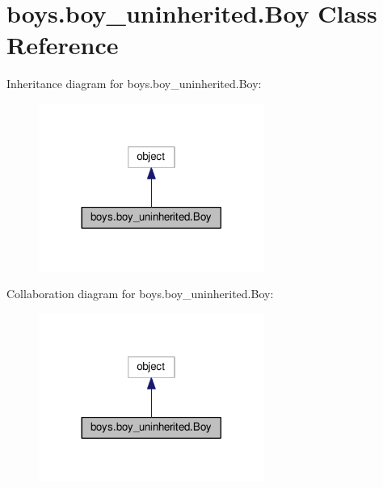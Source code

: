 \hypertarget{classboys_1_1boy__uninherited_1_1_boy}{}\section{boys.\+boy\+\_\+uninherited.\+Boy Class Reference}
\label{classboys_1_1boy__uninherited_1_1_boy}


Inheritance diagram for boys.\+boy\+\_\+uninherited.\+Boy\+:
\nopagebreak
\begin{figure}[H]
\begin{center}
\leavevmode
\includegraphics[width=209pt]{classboys_1_1boy__uninherited_1_1_boy__inherit__graph}
\end{center}
\end{figure}


Collaboration diagram for boys.\+boy\+\_\+uninherited.\+Boy\+:
\nopagebreak
\begin{figure}[H]
\begin{center}
\leavevmode
\includegraphics[width=209pt]{classboys_1_1boy__uninherited_1_1_boy__coll__graph}
\end{center}
\end{figure}
